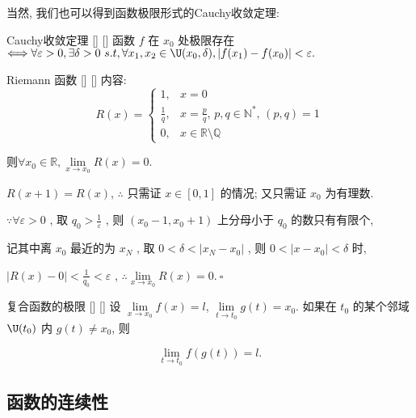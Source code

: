 \documentclass[UTF8]{ctexart}
\begin{document}
			当然, 我们也可以得到函数极限形式的Cauchy收敛定理: 
       
            \begin{thm}
			    []
			    {Cauchy收敛定理}
			    []
			    []
				函数 \(f\) 在 \(x_0\) 处极限存在\(\Longleftrightarrow\forall\varepsilon >0,\exists \delta >0\ s.t,\forall x_1,x_2\in\U(x_0,\delta),|f(x_1)-f(x_0)|<\varepsilon.\)
			\end{thm}

   			\begin{xmp}
			    []
			    {Riemann 函数}
			    []
			    []
				内容: 
				\[ R(x) = 
                \begin{cases} 
                1, & x = 0 \\
                \frac{1}{q}, & x = \frac{p}{q}, \, p, q \in \mathbb{N}^*, \, (p, q) = 1 \\
                0, & x \in \mathbb{R} \setminus \mathbb{Q}
                \end{cases}
                \] 

                则\(\forall x_0 \in \mathbb{R}, \lim\limits_{x \to x_0} R(x) = 0.\) 
            \end{xmp}

                \begin{prf}
                 \( R(x+1) = R(x) \),  \(\therefore\)  只需证  \( x \in [0,1] \)  的情况; 又只需证  \( x_0 \)  为有理数. 

                 \(\because \forall \varepsilon > 0\) , 取  \( q_0 > \frac{1}{\varepsilon} \) , 则  \( (x_0 - 1, x_0 + 1) \)  上分母小于  \( q_0 \)  的数只有有限个, 

                记其中离  \( x_0 \)  最近的为  \( x_N \) , 取  \( 0 < \delta < |x_N - x_0| \) , 则  \( 0 < |x - x_0| < \delta \)  时, 

                 \( |R(x) - 0| < \frac{1}{q_0} < \varepsilon \) ,  \(\therefore \lim\limits_{x \to x_0} R(x) = 0. \ \square\) 
                \end{prf}

        	\begin{thm}
			    []
			    {复合函数的极限}
			    []
			    []
				设 \(\lim\limits_{x \to x_0} f(x) = l\), \(\lim\limits_{t \to t_0} g(t) = x_0\). 如果在 \(t_0\) 的某个邻域 \(\U(t_0)\) 内 \(g(t) \neq x_0\), 则

				 \[
				\lim\limits_{t \to t_0} f(g(t)) = l.
				\] 
			\end{thm}
   
		\subsection{函数的连续性}
			
\end{document}
